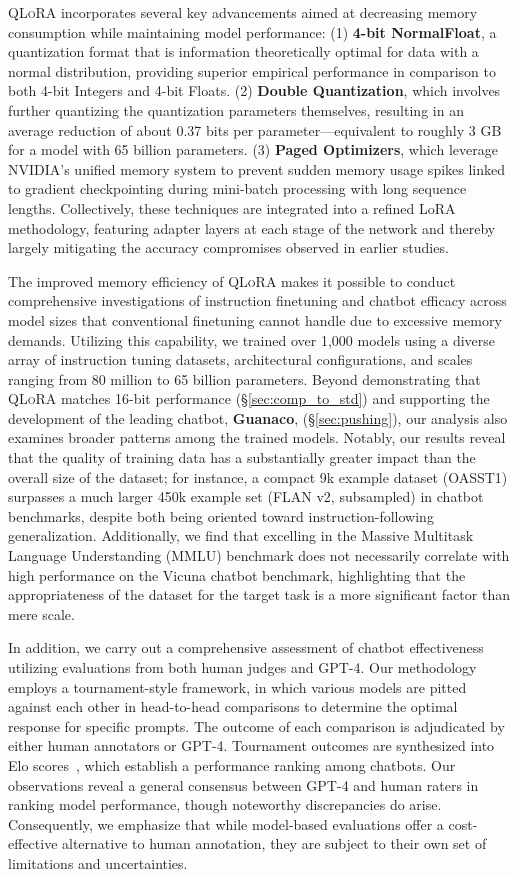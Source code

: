 \textsc{QLoRA} incorporates several key advancements aimed at decreasing memory consumption while maintaining model performance: (1) \textbf{4-bit NormalFloat}, a quantization format that is information theoretically optimal for data with a normal distribution, providing superior empirical performance in comparison to both 4-bit Integers and 4-bit Floats. (2) \textbf{Double Quantization}, which involves further quantizing the quantization parameters themselves, resulting in an average reduction of about 0.37 bits per parameter—equivalent to roughly 3 GB for a model with 65 billion parameters. (3) \textbf{Paged Optimizers}, which leverage NVIDIA's unified memory system to prevent sudden memory usage spikes linked to gradient checkpointing during mini-batch processing with long sequence lengths. Collectively, these techniques are integrated into a refined LoRA methodology, featuring adapter layers at each stage of the network and thereby largely mitigating the accuracy compromises observed in earlier studies.

The improved memory efficiency of \textsc{QLoRA} makes it possible to conduct comprehensive investigations of instruction finetuning and chatbot efficacy across model sizes that conventional finetuning cannot handle due to excessive memory demands. Utilizing this capability, we trained over 1,000 models using a diverse array of instruction tuning datasets, architectural configurations, and scales ranging from 80 million to 65 billion parameters. Beyond demonstrating that \textsc{QLoRA} matches 16-bit performance (\S\ref{sec:comp_to_std}) and supporting the development of the leading chatbot, \textbf{Guanaco}, (\S\ref{sec:pushing}), our analysis also examines broader patterns among the trained models. Notably, our results reveal that the quality of training data has a substantially greater impact than the overall size of the dataset; for instance, a compact 9k example dataset (OASST1) surpasses a much larger 450k example set (FLAN v2, subsampled) in chatbot benchmarks, despite both being oriented toward instruction-following generalization. Additionally, we find that excelling in the Massive Multitask Language Understanding (MMLU) benchmark does not necessarily correlate with high performance on the Vicuna chatbot benchmark, highlighting that the appropriateness of the dataset for the target task is a more significant factor than mere scale.

In addition, we carry out a comprehensive assessment of chatbot effectiveness utilizing evaluations from both human judges and GPT-4. Our methodology employs a tournament-style framework, in which various models are pitted against each other in head-to-head comparisons to determine the optimal response for specific prompts. The outcome of each comparison is adjudicated by either human annotators or GPT-4. Tournament outcomes are synthesized into Elo scores~\citep{elo1967proposed, elo1978rating}, which establish a performance ranking among chatbots. Our observations reveal a general consensus between GPT-4 and human raters in ranking model performance, though noteworthy discrepancies do arise. Consequently, we emphasize that while model-based evaluations offer a cost-effective alternative to human annotation, they are subject to their own set of limitations and uncertainties.

